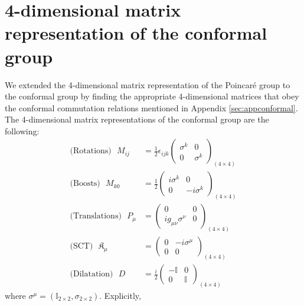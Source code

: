 \documentclass[aps,reprint,notitlepage,nofootinbib,superscriptaddress]{revtex4-1}
\begin{document}
\section{4-dimensional matrix representation of the conformal group} 
\label{4x4}
We extended the 4-dimensional matrix representation of the Poincar\'e group \cite{Bacry} to the conformal group by finding the appropriate 4-dimensional matrices that obey the conformal commutation relations mentioned in Appendix \ref{sec:appconformal}. The 4-dimensional matrix representations of the conformal group  are the following:
\begin{align}
    \text{(Rotations)}~~~M_{ij}&=\frac{1}{2}\epsilon_{ijk}\begin{pmatrix}
    \sigma^{k}&0\\
    0&\sigma^{k}
    \end{pmatrix}_{(4\times4)}\\
    \text{(Boosts)}~~~M_{k0}&=\frac{1}{2}\begin{pmatrix}
    i\sigma^{k}&0\\
    0&-i \sigma^{k}
    \end{pmatrix}_{(4\times4)}\\
    \text{(Translations)}~~~P_{\mu}&=\begin{pmatrix}
    0&0\\
    ig_{\mu\nu}\sigma^{\nu}&0
    \end{pmatrix}_{(4\times4)}\\
    \text{(SCT)}~~~\mathfrak{K}_{\mu}&=\begin{pmatrix}
    0&-i\sigma^{\mu}\\
    0&0
    \end{pmatrix}_{(4\times4)}\\
    \text{(Dilatation)}~~~D&=\frac{i}{2}\begin{pmatrix}
    -\mathbb{I}&0\\
    0&\mathbb{I}
    \end{pmatrix}_{(4\times4)}
\end{align}
where $\sigma^{\mu}=(\mathbb{I}_{2\times2},\sigma_{2\times2})$. Explicitly,
\end{document}
